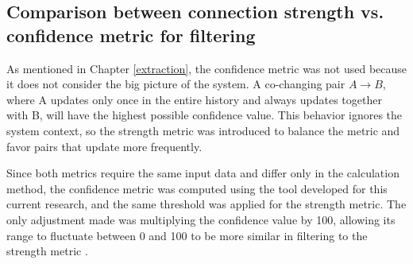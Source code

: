 \subsection{Comparison between connection strength vs. confidence metric for filtering}
\label{sec:measure_metrics}

\hspace{4em}As mentioned in Chapter \ref{extraction}, the confidence metric was not used because it does not consider the big picture of the system. A co-changing pair $A \rightarrow B$, where A updates only once in the entire history and always updates together with B, will have the highest possible confidence value. This behavior ignores the system context, so the strength metric was introduced to balance the metric and favor pairs that update more frequently.

Since both metrics require the same input data and differ only in the calculation method, the confidence metric was computed using the tool developed for this current research, and the same threshold was applied for the strength metric. The only adjustment made was multiplying the confidence value by 100, allowing its range to fluctuate between 0 and 100 to be more similar in filtering to the strength metric \cite{b4}.

\begin{table}[!h]
\setlength\tabcolsep{3.5pt}
\caption{ Average results obtained with strength versus confidence metric.}
\label{tab:confidence_vs_strength}
\centering
{}
\end{table}

